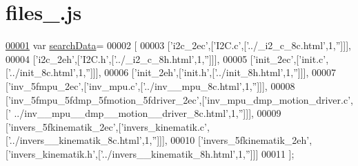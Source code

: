 \hypertarget{files__2_8js_source}{}\section{files\+\_.\+js}
\label{files__2_8js_source}

\begin{DoxyCode}
\hypertarget{files__2_8js_source.tex_l00001}{}\hyperlink{files__2_8js_ad01a7523f103d6242ef9b0451861231e}{00001} var \hyperlink{files__2_8js_ad01a7523f103d6242ef9b0451861231e}{searchData}=
00002 [
00003   [\textcolor{stringliteral}{'i2c\_2ec'},[\textcolor{stringliteral}{'I2C.c'},[\textcolor{stringliteral}{'../\_i2\_c\_8c.html'},1,\textcolor{stringliteral}{''}]]],
00004   [\textcolor{stringliteral}{'i2c\_2eh'},[\textcolor{stringliteral}{'I2C.h'},[\textcolor{stringliteral}{'../\_i2\_c\_8h.html'},1,\textcolor{stringliteral}{''}]]],
00005   [\textcolor{stringliteral}{'init\_2ec'},[\textcolor{stringliteral}{'init.c'},[\textcolor{stringliteral}{'../init\_8c.html'},1,\textcolor{stringliteral}{''}]]],
00006   [\textcolor{stringliteral}{'init\_2eh'},[\textcolor{stringliteral}{'init.h'},[\textcolor{stringliteral}{'../init\_8h.html'},1,\textcolor{stringliteral}{''}]]],
00007   [\textcolor{stringliteral}{'inv\_5fmpu\_2ec'},[\textcolor{stringliteral}{'inv\_mpu.c'},[\textcolor{stringliteral}{'../inv\_\_mpu\_8c.html'},1,\textcolor{stringliteral}{''}]]],
00008   [\textcolor{stringliteral}{'inv\_5fmpu\_5fdmp\_5fmotion\_5fdriver\_2ec'},[\textcolor{stringliteral}{'inv\_mpu\_dmp\_motion\_driver.c'},[\textcolor{stringliteral}{'
      ../inv\_\_mpu\_\_dmp\_\_motion\_\_driver\_8c.html'},1,\textcolor{stringliteral}{''}]]],
00009   [\textcolor{stringliteral}{'invers\_5fkinematik\_2ec'},[\textcolor{stringliteral}{'invers\_kinematik.c'},[\textcolor{stringliteral}{'../invers\_\_kinematik\_8c.html'},1,\textcolor{stringliteral}{''}]]],
00010   [\textcolor{stringliteral}{'invers\_5fkinematik\_2eh'},[\textcolor{stringliteral}{'invers\_kinematik.h'},[\textcolor{stringliteral}{'../invers\_\_kinematik\_8h.html'},1,\textcolor{stringliteral}{''}]]]
00011 ];
\end{DoxyCode}
